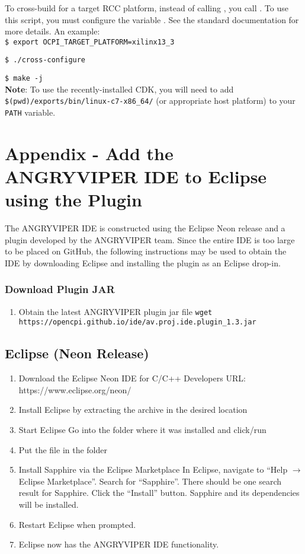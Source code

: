 \begin{appendices}
To cross-build for a target RCC platform, instead of calling , you call . To use this script, you must configure the variable . See the standard documentation for more details. An example:\\

\verb+$ export OCPI_TARGET_PLATFORM=xilinx13_3+

\verb+$ ./cross-configure+

\verb+$ make -j+\\

\textbf{Note}: To use the recently-installed CDK, you will need to add \verb+$(pwd)/exports/bin/linux-c7-x86_64/+ (or appropriate host platform) to your \verb+PATH+ variable.

\newpage
\section{Appendix - Add the ANGRYVIPER IDE to Eclipse using the Plugin}
\label{App:IDE_plugin}
The ANGRYVIPER IDE is constructed using the Eclipse Neon release and a plugin developed by the ANGRYVIPER team. Since the entire IDE is too large to be placed on GitHub, the following instructions may be used to obtain the IDE by downloading Eclipse and installing the plugin as an Eclipse drop-in.

\subsubsection*{Download Plugin JAR}
\begin{enumerate}
\item Obtain the latest ANGRYVIPER plugin jar file
\subitem \verb+wget https://opencpi.github.io/ide/av.proj.ide.plugin_1.3.jar+
\end{enumerate}

\subsection{Eclipse (Neon Release)}
\begin{enumerate}
\item Download the Eclipse Neon IDE for C/C++ Developers
\subitem URL: https://www.eclipse.org/neon/
\item Install Eclipse by extracting the archive in the desired location
\item Start Eclipse
\subitem Go into the folder where it was installed and click/run 
\item Put the  file in the  folder
\item Install Sapphire via the Eclipse Marketplace
\subitem In Eclipse, navigate to ``Help $\rightarrow$ Eclipse Marketplace''. Search for ``Sapphire''. There should be one search result for Sapphire.
Click the ``Install'' button.  Sapphire and its dependencies will be installed.
\item Restart Eclipse when prompted.
\item Eclipse now has the ANGRYVIPER IDE functionality.
\end{enumerate}


\end{appendices}

